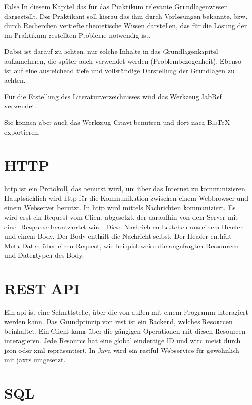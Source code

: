\if False
In diesem Kapitel das für das Praktikum relevante Grundlagenwissen 
dargestellt. Der Praktikant soll hierzu das ihm durch Vorlesungen 
bekannte, bzw. durch Recherchen vertiefte theoretische Wissen 
darstellen, das für die Lösung der im Praktikum gestellten Probleme 
notwendig ist.

Dabei ist darauf zu achten, nur solche Inhalte in das Grundlagenkapitel 
aufzunehmen, die später auch verwendet werden (Problembezogenheit). 
Ebenso ist auf eine ausreichend tiefe und vollständige Darstellung der 
Grundlagen zu achten.

Für die Erstellung des Literaturverzeichnisses 
wird das Werkzeug JabRef\autocite{JabRef:JabRef} verwendet. 

Sie können aber auch das Werkzeug Citavi\autocite{SAS:Citavi} benutzen
und dort nach \textsc{Bib}\TeX{} exportieren.
\fi

\section{HTTP}
\label{sec:http}

\ac{http} ist ein Protokoll, das benutzt wird, um über das Internet zu kommunizieren.
Hauptsächlich wird \ac{http} für die Kommunikation zwischen einem Webbrowser und einem Webserver benutzt.
In \ac{http} wird mittels Nachrichten kommuniziert.
Es wird erst ein Request vom Client abgesetzt, der daraufhin von dem Server mit einer Response beantwortet wird.
Diese Nachrichten bestehen aus einem Header und einem Body.
Der Body enthält die Nachricht selbst.
Der Header enthält Meta-Daten über einen Request, wie beispielsweise die angefragten Ressourcen und Datentypen des Body.

\section{REST API}
\label{sec:rest}

Ein \ac{api} ist eine Schnittstelle, über die von außen mit einem Programm interagiert werden kann.
Das Grundprinzip von \ac{rest} ist ein Backend, welches Resourcen beinhaltet.
Ein Client kann über die gängigen  Operationen mit diesen Resourcen interagieren.
Jede Resource hat eine global eindeutige ID und wird meist durch \ac{json} oder \ac{xml} repräsentiert.
In Java wird ein \ac{rest}ful Webservice für gewöhnlich mit \ac{jaxrs} umgesetzt.
~\autocite{schiesser:javaEE7}

\section{SQL}
\label{sec:sql}

